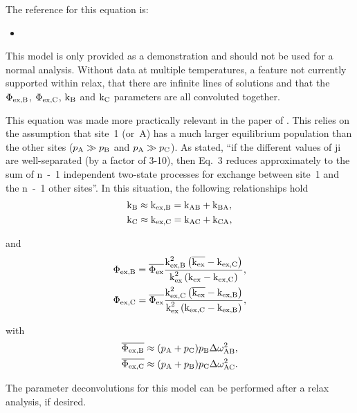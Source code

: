 The reference for this equation is:
\begin{itemize}
\item {}
\end{itemize}

This model is only provided as a demonstration and should not be used for a normal analysis.
Without data at multiple temperatures, a feature not currently supported within relax, that there are infinite lines of solutions and that the $\Phi_\textrm{ex,B}$, $\Phi_\textrm{ex,C}$, $\textrm{k}_\textrm{B}$ and $\textrm{k}_\textrm{C}$ parameters are all convoluted together.

This equation was made more practically relevant in the paper of \citet{OConnell09}.
This relies on the assumption that site~1 (or~A) has a much larger equilibrium population than the other sites ($p_\textrm{A} \gg p_\textrm{B}$ and $p_\textrm{A} \gg p_\textrm{C}$).
As stated, ``if the different values of ji are well-separated (by a factor of 3-10), then Eq.~3 reduces approximately to the sum of n~-~1 independent two-state processes for exchange between site~1 and the n~-~1 other sites''.
In this situation, the following relationships hold
\begin{subequations}
\begin{align}
    &\textrm{k}_\textrm{B} \approx \textrm{k}_\textrm{ex,B} = \textrm{k}_\textrm{AB} + \textrm{k}_\textrm{BA} , \\
    &\textrm{k}_\textrm{C} \approx \textrm{k}_\textrm{ex,C} = \textrm{k}_\textrm{AC} + \textrm{k}_\textrm{CA} ,
\end{align}
\end{subequations}

and
\begin{subequations}
\begin{align}
    &\Phi_\textrm{ex,B} = \overline{\Phi_\textrm{ex}} \frac{\textrm{k}_\textrm{ex,B}^2 \left( \overline{\textrm{k}_\textrm{ex}} - \textrm{k}_\textrm{ex,C} \right)}{\textrm{k}_\textrm{ex}^2 \left( \textrm{k}_\textrm{ex} - \textrm{k}_\textrm{ex,C} \right)} , \label{eq: disp phiexB} \\
    &\Phi_\textrm{ex,C} = \overline{\Phi_\textrm{ex}} \frac{\textrm{k}_\textrm{ex,C}^2 \left( \overline{\textrm{k}_\textrm{ex}} - \textrm{k}_\textrm{ex,B} \right)}{\textrm{k}_\textrm{ex}^2 \left( \textrm{k}_\textrm{ex,C} - \textrm{k}_\textrm{ex,B} \right)} , \label{eq: disp phiexC}
\end{align}
\end{subequations}

with
\begin{subequations}
\begin{align}
    &\overline{\Phi_\textrm{ex,B}} \approx (p_\textrm{A} + p_\textrm{C}) p_\textrm{B} \Delta\omega_\textrm{AB}^2 , \\
    &\overline{\Phi_\textrm{ex,C}} \approx (p_\textrm{A} + p_\textrm{B}) p_\textrm{C} \Delta\omega_\textrm{AC}^2 .
\end{align}
\end{subequations}

The parameter deconvolutions for this model can be performed after a relax analysis, if desired.



